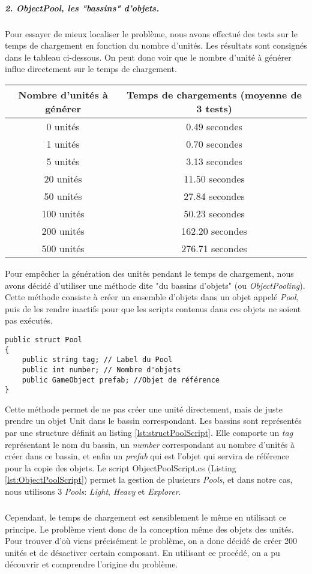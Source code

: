 \documentclass{report}
\begin{document}
\subparagraph{2. \textit{ObjectPool}, les "bassins" d'objets.}Pour essayer de mieux localiser le problème, nous avons effectué des tests sur le temps de chargement en fonction du nombre d'unités. Les résultats sont consignés dans le tableau ci-dessous. On peut donc voir que le nombre d'unité à générer influe directement sur le temps de chargement.\newline
\begin{center}
\begin{tabular}{c|c}
  \hline
  Nombre d'unités à générer & Temps de chargements (moyenne de 3 tests) \\
  \hline
  0 unités & 0.49 secondes \\
  1 unités & 0.70 secondes \\
  5 unités & 3.13 secondes \\
  20 unités & 11.50 secondes \\
  50 unités & 27.84 secondes \\
  100 unités & 50.23 secondes \\
  200 unités & 162.20 secondes \\
  500 unités & 276.71 secondes \\
  \hline
\end{tabular}
\end{center}
Pour empêcher la génération des unités pendant le temps de chargement, nous avons décidé d'utiliser une méthode dite "du bassins d'objets" (ou \textit{ObjectPooling}). Cette méthode consiste à créer un ensemble d'objets dans un objet appelé \textit{Pool}, puis de les rendre inactifs pour que les scripts contenus dans ces objets ne soient pas exécutés.

 \begin{lstlisting}[language={[Sharp]C},label={lst:structPoolScript}, caption= Code de la structure \textit{Pool} de ObjectPool.cs]
public struct Pool
{
    public string tag; // Label du Pool
    public int number; // Nombre d'objets
    public GameObject prefab; //Objet de référence
}
\end{lstlisting}

Cette méthode permet de ne pas créer une unité directement, mais de juste prendre un objet Unit dans le bassin correspondant. Les bassins sont représentés par une structure définit au listing \ref{lst:structPoolScript}. Elle comporte un \textit{tag} représentant le nom du bassin, un  \textit{number} correspondant au nombre d'unités à créer dans ce bassin, et enfin un \textit{prefab} qui est l'objet qui servira de référence pour la copie des objets. Le script ObjectPoolScript.cs (Listing  \ref{lst:ObjectPoolScript}) permet la gestion de plusieurs \textit{Pools}, et dans notre cas, nous utilisons 3 \textit{Pools}:  \textit{Light},  \textit{Heavy} et  \textit{Explorer}.
\subparagraph{} Cependant, le temps de chargement est sensiblement le même en utilisant ce principe. Le problème vient donc de la conception même des objets des unités. \newline
Pour trouver d’où viens précisément le problème, on a donc décidé de créer 200 unités et de désactiver certain composant. En utilisant ce procédé, on a pu découvrir et comprendre l'origine du problème.
\end{document}
